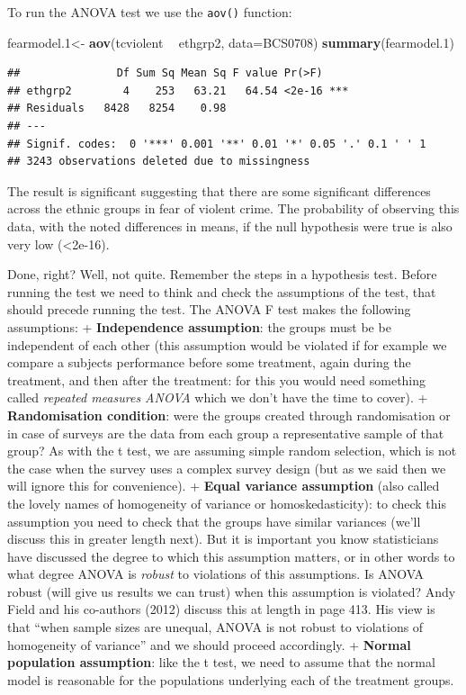 \documentclass[]{book}
\newenvironment{Shaded}{\begin{snugshade}}{\end{snugshade}}
\newcommand{\DataTypeTok}[1]{\textcolor[rgb]{0.13,0.29,0.53}{#1}}
\newcommand{\FloatTok}[1]{\textcolor[rgb]{0.00,0.00,0.81}{#1}}
\newcommand{\KeywordTok}[1]{\textcolor[rgb]{0.13,0.29,0.53}{\textbf{#1}}}
\newcommand{\NormalTok}[1]{#1}
\newcommand{\OperatorTok}[1]{\textcolor[rgb]{0.81,0.36,0.00}{\textbf{#1}}}
\newcommand{\StringTok}[1]{\textcolor[rgb]{0.31,0.60,0.02}{#1}}
\theoremstyle{definition}
\theoremstyle{definition}
\theoremstyle{definition}
\theoremstyle{remark}
\begin{document}
To run the ANOVA test we use the \texttt{aov()} function:

\begin{Shaded}
\begin{Highlighting}[]
\NormalTok{fearmodel}\FloatTok{.1}\NormalTok{<-}\StringTok{ }\KeywordTok{aov}\NormalTok{(tcviolent }\OperatorTok{~}\StringTok{ }\NormalTok{ethgrp2, }\DataTypeTok{data=}\NormalTok{BCS0708)}
\KeywordTok{summary}\NormalTok{(fearmodel}\FloatTok{.1}\NormalTok{)}
\end{Highlighting}
\end{Shaded}

\begin{verbatim}
##               Df Sum Sq Mean Sq F value Pr(>F)    
## ethgrp2        4    253   63.21   64.54 <2e-16 ***
## Residuals   8428   8254    0.98                   
## ---
## Signif. codes:  0 '***' 0.001 '**' 0.01 '*' 0.05 '.' 0.1 ' ' 1
## 3243 observations deleted due to missingness
\end{verbatim}

The result is significant suggesting that there are some significant
differences across the ethnic groups in fear of violent crime. The
probability of observing this data, with the noted differences in means,
if the null hypothesis were true is also very low (\textless{}2e-16).

Done, right? Well, not quite. Remember the steps in a hypothesis test.
Before running the test we need to think and check the assumptions of
the test, that should precede running the test. The ANOVA F test makes
the following assumptions: + \textbf{Independence assumption}: the
groups must be be independent of each other (this assumption would be
violated if for example we compare a subjects performance before some
treatment, again during the treatment, and then after the treatment: for
this you would need something called \emph{repeated measures ANOVA}
which we don't have the time to cover). + \textbf{Randomisation
condition}: were the groups created through randomisation or in case of
surveys are the data from each group a representative sample of that
group? As with the t test, we are assuming simple random selection,
which is not the case when the survey uses a complex survey design (but
as we said then we will ignore this for convenience). + \textbf{Equal
variance assumption} (also called the lovely names of homogeneity of
variance or homoskedasticity): to check this assumption you need to
check that the groups have similar variances (we'll discuss this in
greater length next). But it is important you know statisticians have
discussed the degree to which this assumption matters, or in other words
to what degree ANOVA is \emph{robust} to violations of this assumptions.
Is ANOVA robust (will give us results we can trust) when this assumption
is violated? Andy Field and his co-authors (2012) discuss this at length
in page 413. His view is that ``when sample sizes are unequal, ANOVA is
not robust to violations of homogeneity of variance'' and we should
proceed accordingly. + \textbf{Normal population assumption}: like the t
test, we need to assume that the normal model is reasonable for the
populations underlying each of the treatment groups.
\end{document}
